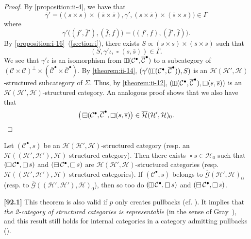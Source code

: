 \documentclass[a4paper,fleqn]{article}
\theoremstyle{plain}
\newenvironment{theorem}[1]
  {\renewcommand\theinnertheorem{#1}\innertheorem}
  {\endinnertheorem}
\theoremstyle{definition}
\newenvironment{longcomm}[1]
  {\noindent\textbf{[#1]}\rmfamily}
  {}
\newcommand{\oldpage}[1]{{\marginpar{\footnotesize$\bigg\vert$\,\,\,\,\textit{p.~#1}}}}
\newcommand{\CC}{\mathcal{C}}
\newcommand{\HH}{\mathcal{H}}
\newcommand{\subs}{\mathrel{\propto}}
\newcommand{\GG}{\mathcal{G}}
\newcommand{\hsqbox}{{\boxminus}}
\newcommand{\vsqbox}{{\rotatebox{90}{$\boxminus$}}}
\DeclareMathOperator{\sq}{\square}
\DeclareMathOperator{\hsq}{\raisebox{-.05em}{$\hsqbox$}}
\DeclareMathOperator{\vsq}{\raisebox{-.1em}{$\vsqbox$}}
\begin{document}
\begin{proof}
  By \cref{proposition:ii-4}, we have that
  \[
    \overline{\gamma}'
    = \big(
      (s\times s)\times(\overline{s}\times\overline{s}),
      \gamma',
      (s\times\overline{s})\times(\overline{s}\times s)
    \big)
    \in\Gamma
  \]
  where
  \[
    \gamma'\big((f',\overline{f}'),(\overline{f},f)\big)
    = \big((f',f),(\overline{f}',\overline{f})\big).
  \]
  By \cref{proposition:i-16}~(\cref{section:i}), there exists $S\subs(s\times s)\times(\overline{s}\times\overline{s})$ such that
  \[
    (S,\gamma'\iota,\sq(s,\overline{s}))
    \in\Gamma.
  \]
  We see that $\gamma'\iota$ is an isomorphism from $\vsq(\CC^\bullet,\overline{\CC}^\bullet)$ to a subcategory of $(\CC\times\CC)^\perp\times(\overline{\CC}^\bullet\times\overline{\CC}^\bullet)$.
  By \cref{theorem:ii-14}, $(\gamma'(\vsq(\CC^\bullet,\overline{\CC}^\bullet)),S)$ is an $\HH(\HH',\HH)$-structured subcategory of $\Sigma$.
  Thus, by \cref{theorem:ii-12}, $(\vsq(\CC^\bullet,\overline{\CC}^\bullet),\sq(s,\overline{s}))$ is an $\HH(\HH',\HH)$-structured category.
  An analogous proof shows that we also have that
  \[
    \big(\hsq(\CC^\bullet,\overline{\CC}^\bullet,\sq(s,\overline{s})\big)
    \in\overline{\HH}(\HH',\HH)_0.
    \qedhere
  \]
\end{proof}

\begin{theorem}{16}
\label{theorem:ii-16}
  \oldpage{420}
  Let $(\CC^\bullet,s)$ be an $\HH(\HH',\HH)$-structured category (resp. an $\HH((\HH',\HH'),\HH)$-structured category).
  Then there exists $\sq s\in\HH_0$ such that $(\vsq\CC^\bullet,\sq s)$ and $(\hsq\CC^\bullet,\sq s)$ are $\HH(\HH',\HH)$-structured categories (resp. $\HH((\HH',\HH'),\HH)$-structured categories).
  If $(\CC^\bullet,s)$ belongs to $\overline{\GG}(\HH',\HH)_0$ (resp. to $\overline{\GG}((\HH',\HH'),\HH)_0$), then so too do $(\vsq\CC^\bullet,\sq s)$ and $(\hsq\CC^\bullet,\sq s)$.
\end{theorem}

\begin{longcomm}{92.1}
  This theorem is also valid if $p$ only creates pullbacks (cf. \cite{coll109}).
  It implies that \emph{the 2-category of structured categories is representable} (in the sense of Gray~\cite{comm39}), and this result still holds for internal categories in a category admitting pullbacks (\cite{coll115,comm39}).
\end{longcomm}
\end{document}
